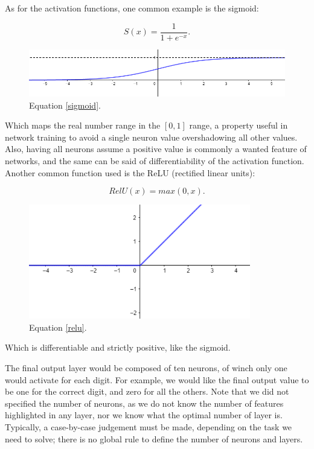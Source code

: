\documentclass[a4paper]{report}
\begin{document}
As for the activation functions, one common example is the sigmoid:

\begin{equation}
	S(x) = \frac{1}{1+e^{-x}}.
	\label{sigmoid}
\end{equation}

\begin{figure}[H]
\centering
\includegraphics[width=\textwidth]{o/sigmoid.png}
\caption{Equation \ref{sigmoid}.}
\end{figure}
Which maps the real number range in the $[0,1]$ range, a property useful in network training to avoid a single neuron value overshadowing all other values.
Also, having all neurons assume a positive value is commonly a wanted feature of networks, and the same can be said of differentiability of the activation function.
Another common function used is the ReLU (rectified linear units):

\begin{equation}
	RelU(x) = max(0, x).
	\label{relu}
\end{equation}

\begin{figure}[H]
\centering
\includegraphics[height=5cm]{o/relu.png}
\caption{Equation \ref{relu}.}
\end{figure}

Which is differentiable and strictly positive, like the sigmoid.

The final output layer would be composed of ten neurons, of winch only one would activate for each digit.
For example, we would like the final output value to be one for the correct digit, and zero for all the others.
Note that we did not specified the number of neurons, as we do not know the number of features highlighted in any layer, nor we know what the optimal number of layer is.
Typically, a case-by-case judgement must be made, depending on the task we need to solve;
there is no global rule to define the number of neurons and layers.
\end{document}

